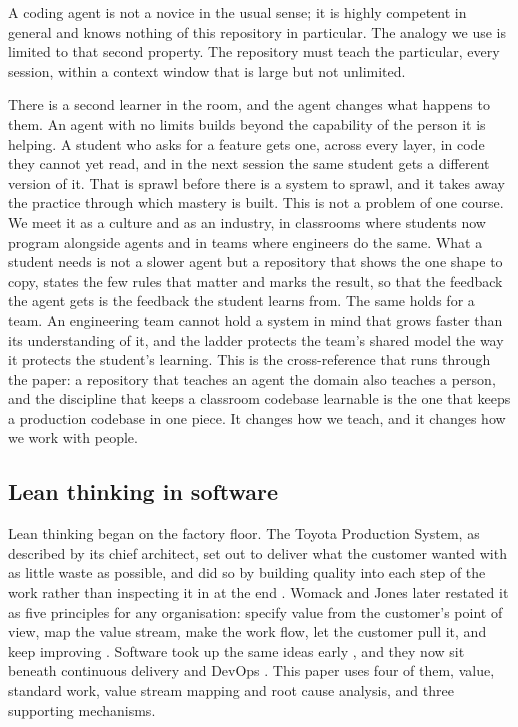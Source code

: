 A coding agent is not a novice in the usual sense; it is highly competent in general and knows
nothing of this repository in particular. The analogy we use is limited to that second property.
The repository must teach the particular, every session, within a context window that is large
but not unlimited.

There is a second learner in the room, and the agent changes what happens to them. An agent
with no limits builds beyond the capability of the person it is helping. A student who asks for
a feature gets one, across every layer, in code they cannot yet read, and in the next session
the same student gets a different version of it. That is sprawl before there is a system to
sprawl, and it takes away the practice through which mastery is built. This is not a problem of one
course. We meet it as a culture and as an industry, in classrooms where students now program
alongside agents and in teams where engineers do the same. What a student
needs is not a slower agent but a repository that shows the one shape to copy, states the few
rules that matter and marks the result, so that the feedback the agent gets is the feedback the
student learns from. The same holds for a team. An engineering team cannot hold a system in mind
that grows faster than its understanding of it, and the ladder protects the team's shared model
the way it protects the student's learning. This is the cross-reference that runs through the
paper: a repository that teaches an agent the domain also teaches a person, and the discipline
that keeps a classroom codebase learnable is the one that keeps a production codebase in one
piece. It changes how we teach, and it changes how we work with people.

\subsection{Lean thinking in software}

Lean thinking began on the factory floor. The Toyota Production System, as described by its
chief architect, set out to deliver what the customer wanted with as little waste as possible,
and did so by building quality into each step of the work rather than inspecting it in at the end
\citep{ohno1988tps}. Womack and Jones later restated it as five principles for any organisation:
specify value from the customer's point of view, map the value stream, make the work flow, let the
customer pull it, and keep improving \citep{womack1996lean}. Software took up the same ideas early
\citep{poppendieck2003lean,poppendieck2006implementing}, and they now sit beneath continuous
delivery and DevOps \citep{forsgren2018accelerate}. This paper uses four of them, value, standard
work, value stream mapping and root cause analysis, and three supporting mechanisms.

